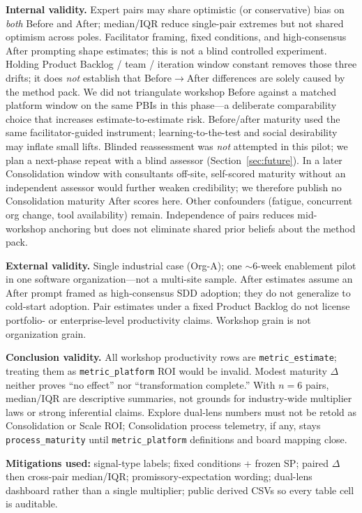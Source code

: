 \documentclass[10pt,conference]{IEEEtran}
\begin{document}
\textbf{Internal validity.}
Expert pairs may share optimistic (or conservative) bias on \emph{both} Before and After; median/IQR reduce single-pair extremes but not shared optimism across poles.
Facilitator framing, fixed conditions, and high-consensus After prompting shape estimates; this is not a blind controlled experiment.
Holding Product Backlog / team / iteration window constant removes those three drifts; it does \emph{not} establish that Before$\rightarrow$After differences are solely caused by the method pack.
We did not triangulate workshop Before against a matched platform window on the same PBIs in this phase---a deliberate comparability choice that increases estimate-to-estimate risk.
Before/after maturity used the same facilitator-guided instrument; learning-to-the-test and social desirability may inflate small lifts.
Blinded reassessment was \emph{not} attempted in this pilot; we plan a next-phase repeat with a blind assessor (Section~\ref{sec:future}).
In a later Consolidation window with consultants off-site, self-scored maturity without an independent assessor would further weaken credibility; we therefore publish no Consolidation maturity After scores here.
Other confounders (fatigue, concurrent org change, tool availability) remain.
Independence of pairs reduces mid-workshop anchoring but does not eliminate shared prior beliefs about the method pack.

\textbf{External validity.}
Single industrial case (Org-A); one $\sim$6-week enablement pilot in one software organization---not a multi-site sample.
After estimates assume an After prompt framed as high-consensus SDD adoption; they do not generalize to cold-start adoption.
Pair estimates under a fixed Product Backlog do not license portfolio- or enterprise-level productivity claims.
Workshop grain is not organization grain.

\textbf{Conclusion validity.}
All workshop productivity rows are \texttt{metric\_estimate}; treating them as \texttt{metric\_platform} ROI would be invalid.
Modest maturity $\Delta$ neither proves ``no effect'' nor ``transformation complete.''
With $n=6$ pairs, median/IQR are descriptive summaries, not grounds for industry-wide multiplier laws or strong inferential claims.
Explore dual-lens numbers must not be retold as Consolidation or Scale ROI; Consolidation process telemetry, if any, stays \texttt{process\_maturity} until \texttt{metric\_platform} definitions and board mapping close.

\textbf{Mitigations used:} signal-type labels; fixed conditions + frozen SP; paired $\Delta$ then cross-pair median/IQR; promissory-expectation wording; dual-lens dashboard rather than a single multiplier; public derived CSVs so every table cell is auditable.
\end{document}
